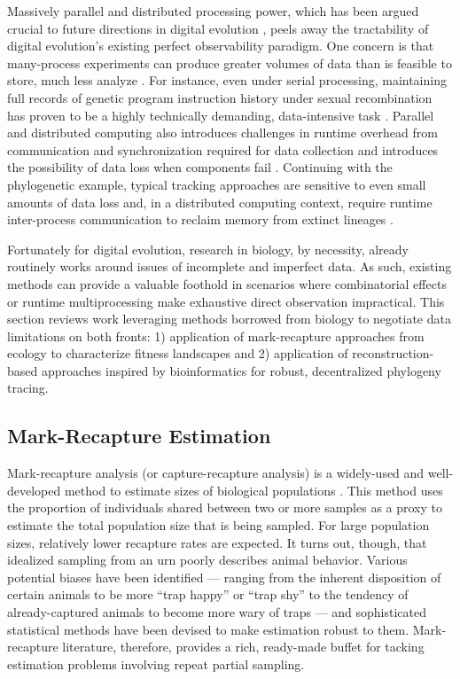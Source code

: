 Massively parallel and distributed processing power, which has been argued crucial to future directions in digital evolution \citep{moreno2022best,taylor2016open}, peels away the tractability of digital evolution's existing perfect observability paradigm.
One concern is that many-process experiments can produce greater volumes of data than is feasible to store, much less analyze \citep{klasky2021data}.
For instance, even under serial processing, maintaining full records of genetic program instruction history under sexual recombination has proven to be a highly technically demanding, data-intensive task \citep{mcphee2016using}.
Parallel and distributed computing also introduces challenges in runtime overhead from communication and synchronization required for data collection and introduces the possibility of data loss when components fail \citep{snir2014addressing}.
Continuing with the phylogenetic example, typical tracking approaches are sensitive to even small amounts of data loss and, in a distributed computing context, require runtime inter-process communication to reclaim memory from extinct lineages \citep{moreno2024algorithms}.

Fortunately for digital evolution, research in biology, by necessity, already routinely works around issues of incomplete and imperfect data.
As such, existing methods can provide a valuable foothold in scenarios where combinatorial effects or runtime multiprocessing make exhaustive direct observation impractical.
This section reviews work leveraging methods borrowed from biology to negotiate data limitations on both fronts: 1) application of mark-recapture approaches from ecology to characterize fitness landscapes and 2) application of reconstruction-based approaches inspired by bioinformatics for robust, decentralized phylogeny tracing.

\subsection{Mark-Recapture Estimation}

Mark-recapture analysis (or capture-recapture analysis) is a widely-used and well-developed method to estimate sizes of biological populations \citep{amstrup2010handbook}.
This method uses the proportion of individuals shared between two or more samples as a proxy to estimate the total population size that is being sampled.
For large population sizes, relatively lower recapture rates are expected.
It turns out, though, that idealized sampling from an urn poorly describes animal behavior.
Various potential biases have been identified --- ranging from the inherent disposition of certain animals to be more ``trap happy'' or ``trap shy'' to the tendency of already-captured animals to become more wary of traps --- and sophisticated statistical methods have been devised to make estimation robust to them.
Mark-recapture literature, therefore, provides a rich, ready-made buffet for tacking estimation problems involving repeat partial sampling.

